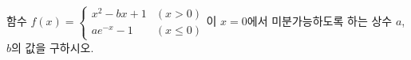 함수 $f(x)=\begin{cases} x^2-bx+1 & (x>0) \\ ae^{-x}-1 & (x\le 0) \end{cases}$이 $x=0$에서 미분가능하도록 하는 상수 $a$, $b$의 값을 구하시오.
